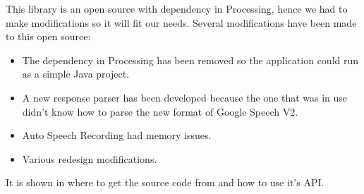 This library is an open source with dependency in Processing, hence we had to make modifications so it will fit our needs. Several modifications have been made to this open source:
\begin{itemize}
	\item The dependency in Processing has been removed so the application could run as a simple Java project. 
	\item A new response parser has been developed because the one that was in use didn't know how to parse the new format of Google Speech V2.
	\item Auto Speech Recording had memory issues.
	\item Various redesign modifications.
\end{itemize}
It is shown in \citet{getflourish14} where to get the source code from and how to use it's API.
